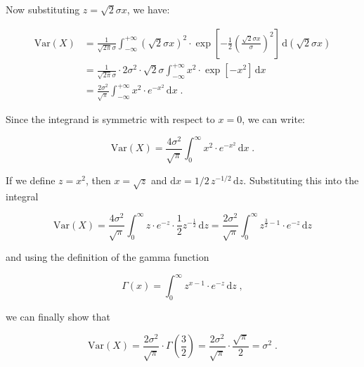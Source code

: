 \documentclass[a4paper,12pt]{book}
\begin{document}
Now substituting $z = \sqrt{2} \sigma x$, we have:

\begin{equation} \label{eq:norm-var-norm-var-s3}
\begin{split}
\mathrm{Var}(X) &= \frac{1}{\sqrt{2 \pi} \sigma} \int_{-\infty}^{+\infty} (\sqrt{2} \sigma x)^2 \cdot \exp \left[ -\frac{1}{2} \left( \frac{\sqrt{2} \sigma x}{\sigma} \right)^2 \right] \, \mathrm{d}(\sqrt{2} \sigma x) \\
&= \frac{1}{\sqrt{2 \pi} \sigma} \cdot 2 \sigma^2 \cdot \sqrt{2} \sigma \int_{-\infty}^{+\infty} x^2 \cdot \exp \left[ -x^2 \right] \, \mathrm{d}x \\
&= \frac{2 \sigma^2}{\sqrt{\pi}} \int_{-\infty}^{+\infty} x^2 \cdot e^{-x^2} \, \mathrm{d}x \; .
\end{split}
\end{equation}

Since the integrand is symmetric with respect to $x = 0$, we can write:

\begin{equation} \label{eq:norm-var-norm-var-s4}
\mathrm{Var}(X) = \frac{4 \sigma^2}{\sqrt{\pi}} \int_{0}^{\infty} x^2 \cdot e^{-x^2} \, \mathrm{d}x \; .
\end{equation}

If we define $z = x^2$, then $x = \sqrt{z}$ and $\mathrm{d}x = 1/2 \, z^{-1/2} \, \mathrm{d}z$. Substituting this into the integral

\begin{equation} \label{eq:norm-var-norm-var-s5}
\mathrm{Var}(X) = \frac{4 \sigma^2}{\sqrt{\pi}} \int_{0}^{\infty} z \cdot e^{-z} \cdot \frac{1}{2} z^{-\frac{1}{2}} \, \mathrm{d}z = \frac{2 \sigma^2}{\sqrt{\pi}} \int_{0}^{\infty} z^{\frac{3}{2}-1} \cdot e^{-z} \, \mathrm{d}z
\end{equation}

and using the definition of the gamma function

\begin{equation} \label{eq:norm-var-gam-fct}
\Gamma(x) = \int_{0}^{\infty} z^{x-1} \cdot e^{-z} \, \mathrm{d}z \; ,
\end{equation}

we can finally show that

\begin{equation} \label{eq:norm-var-norm-var-s6}
\mathrm{Var}(X) = \frac{2 \sigma^2}{\sqrt{\pi}} \cdot \Gamma\!\left(\frac{3}{2}\right) = \frac{2 \sigma^2}{\sqrt{\pi}} \cdot \frac{\sqrt{\pi}}{2} = \sigma^2 \; .
\end{equation}
\end{document}
